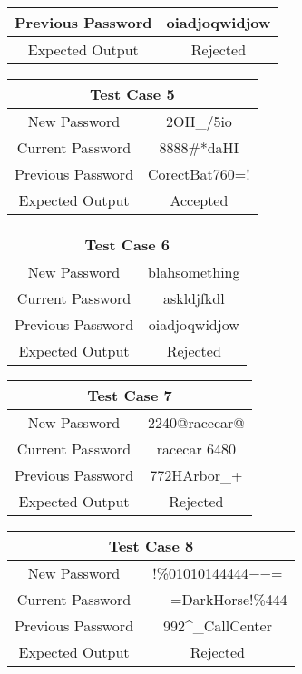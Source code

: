 \documentclass[12pt,letterpaper]{article}
\begin{document}
\begin{table}[h]
\begin{centering}
\begin{tabular}{||c|c||}
  \hline
  Previous Password & oiadjoqwidjow \\
  \hline
  Expected Output & Rejected \\
  \hline
  \end{tabular}
  \begin{tabular}{||c|c||}
  \hline
  \multicolumn{2}{||c||}{Test Case 5} \\
  \hline
  New Password & 2OH\_/5io \\
  \hline
  Current Password & 8888\#*daHI\\
  \hline
  Previous Password & CorectBat760=! \\
  \hline
  Expected Output & Accepted \\
  \hline
  \end{tabular}
  \begin{tabular}{||c|c||}
  \hline
  \multicolumn{2}{||c||}{Test Case 6} \\
  \hline
  New Password & blahsomething \\
  \hline
  Current Password & askldjfkdl \\
  \hline
  Previous Password & oiadjoqwidjow \\
  \hline
  Expected Output & Rejected \\
  \hline
  \end{tabular}
  \begin{tabular}{||c|c||}
  \hline
  \multicolumn{2}{||c||}{Test Case 7} \\
  \hline
  New Password & 2240@racecar@ \\
  \hline
  Current Password & racecar 6480 \\
  \hline
  Previous Password & 772HArbor\_+ \\
  \hline
  Expected Output & Rejected \\
  \hline
  \end{tabular}
  \begin{tabular}{||c|c||}
  \hline
  \multicolumn{2}{||c||}{Test Case 8} \\
  \hline
  New Password & !\%01010144444$-$$-$= \\
  \hline
  Current Password & $-$$-$=DarkHorse!\%444 \\
  \hline
  Previous Password & 992\^{}\_CallCenter \\
  \hline
  Expected Output & Rejected \\
  \hline
  \end{tabular}
  \begin{tabular}{||c|c||}

\end{tabular}
\end{centering}
\end{table}
\end{document}
